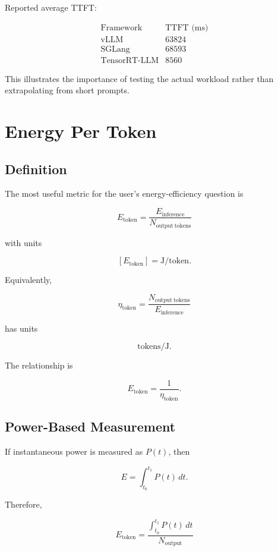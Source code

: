 \documentclass[11pt,a4paper]{article}
\begin{document}
Reported average TTFT:

\[
\begin{array}{l|r}
\text{Framework} & \text{TTFT (ms)}\\
\hline
\text{vLLM} & 63824\\
\text{SGLang} & 68593\\
\text{TensorRT-LLM} & 8560
\end{array}
\]

This illustrates the importance of testing the actual workload rather
than extrapolating from short prompts.

\section{Energy Per Token}

\subsection{Definition}

The most useful metric for the user's energy-efficiency question is

\[
\boxed{
E_{\mathrm{token}}
=
\frac{E_{\mathrm{inference}}}
{N_{\mathrm{output\ tokens}}}
}
\]

with units

\[
[E_{\mathrm{token}}]
=
\mathrm{J/token}.
\]

Equivalently,

\[
\boxed{
\eta_{\mathrm{token}}
=
\frac{N_{\mathrm{output\ tokens}}}
{E_{\mathrm{inference}}}
}
\]

has units

\[
\mathrm{tokens/J}.
\]

The relationship is

\[
E_{\mathrm{token}}
=
\frac{1}{\eta_{\mathrm{token}}}.
\]

\subsection{Power-Based Measurement}

If instantaneous power is measured as $P(t)$, then

\[
E
=
\int_{t_0}^{t_1}P(t)\,dt.
\]

Therefore,

\[
\boxed{
E_{\mathrm{token}}
=
\frac{
\int_{t_0}^{t_1}P(t)\,dt
}{
N_{\mathrm{output}}
}
}
\]
\end{document}
